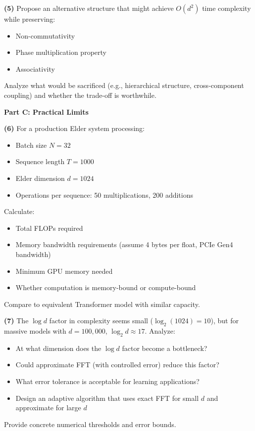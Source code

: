 \begin{critical}
\textbf{(5)} Propose an alternative structure that might achieve $O(d^2)$ time complexity while preserving:
\begin{itemize}
\item Non-commutativity
\item Phase multiplication property
\item Associativity
\end{itemize}

Analyze what would be sacrificed (e.g., hierarchical structure, cross-component coupling) and whether the trade-off is worthwhile.

\textbf{Part C: Practical Limits}

\textbf{(6)} For a production Elder system processing:
\begin{itemize}
\item Batch size $N = 32$
\item Sequence length $T = 1000$  
\item Elder dimension $d = 1024$
\item Operations per sequence: 50 multiplications, 200 additions
\end{itemize}

Calculate:
\begin{itemize}
\item Total FLOPs required
\item Memory bandwidth requirements (assume 4 bytes per float, PCIe Gen4 bandwidth)
\item Minimum GPU memory needed
\item Whether computation is memory-bound or compute-bound
\end{itemize}

Compare to equivalent Transformer model with similar capacity.

\textbf{(7)} The $\log d$ factor in complexity seems small ($\log_2(1024) = 10$), but for massive models with $d = 100,000$, $\log_2 d \approx 17$. Analyze:
\begin{itemize}
\item At what dimension does the $\log d$ factor become a bottleneck?
\item Could approximate FFT (with controlled error) reduce this factor?
\item What error tolerance is acceptable for learning applications?
\item Design an adaptive algorithm that uses exact FFT for small $d$ and approximate for large $d$
\end{itemize}

Provide concrete numerical thresholds and error bounds.
\end{critical}

